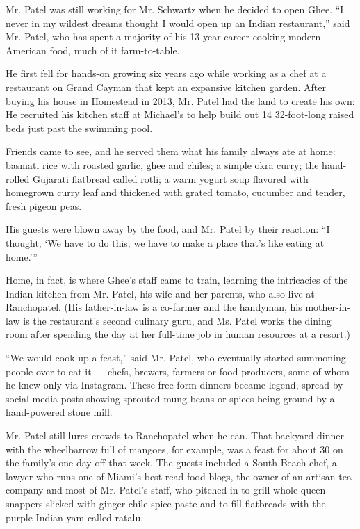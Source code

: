 Mr. Patel was still working for Mr. Schwartz when he decided to open
Ghee. ``I never in my wildest dreams thought I would open up an Indian
restaurant,'' said Mr. Patel, who has spent a majority of his 13-year
career cooking modern American food, much of it farm-to-table.

He first fell for hands-on growing six years ago while working as a chef
at a restaurant on Grand Cayman that kept an expansive kitchen garden.
After buying his house in Homestead in 2013, Mr. Patel had the land to
create his own: He recruited his kitchen staff at Michael's to help
build out 14 32-foot-long raised beds just past the swimming pool.

Friends came to see, and he served them what his family always ate at
home: basmati rice with roasted garlic, ghee and chiles; a simple okra
curry; the hand-rolled Gujarati flatbread called rotli; a warm yogurt
soup flavored with homegrown curry leaf and thickened with grated
tomato, cucumber and tender, fresh pigeon peas.

His guests were blown away by the food, and Mr. Patel by their reaction:
``I thought, `We have to do this; we have to make a place that's like
eating at home.'''

Home, in fact, is where Ghee's staff came to train, learning the
intricacies of the Indian kitchen from Mr. Patel, his wife and her
parents, who also live at Ranchopatel. (His father-in-law is a co-farmer
and the handyman, his mother-in-law is the restaurant's second culinary
guru, and Ms. Patel works the dining room after spending the day at her
full-time job in human resources at a resort.)

``We would cook up a feast,'' said Mr. Patel, who eventually started
summoning people over to eat it --- chefs, brewers, farmers or food
producers, some of whom he knew only via Instagram. These free-form
dinners became legend, spread by social media posts showing sprouted
mung beans or spices being ground by a hand-powered stone mill.

Mr. Patel still lures crowds to Ranchopatel when he can. That backyard
dinner with the wheelbarrow full of mangoes, for example, was a feast
for about 30 on the family's one day off that week. The guests included
a South Beach chef, a lawyer who runs one of Miami's best-read food
blogs, the owner of an artisan tea company and most of Mr. Patel's
staff, who pitched in to grill whole queen snappers slicked with
ginger-chile spice paste and to fill flatbreads with the purple Indian
yam called ratalu.

